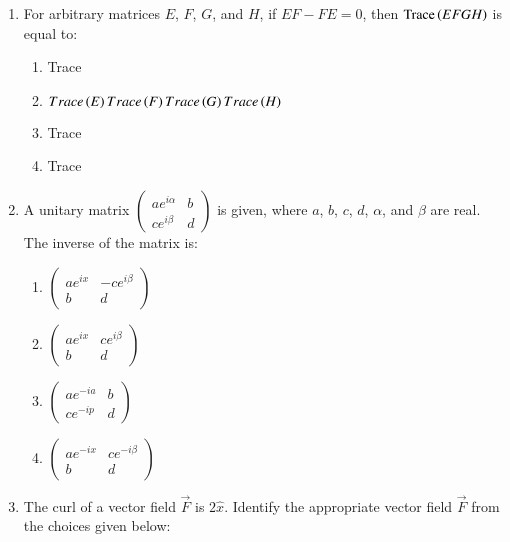 \documentclass[journal,9pt,onecolumn]{IEEEtran}
\begin{document}
\begin{enumerate}


\item For arbitrary matrices $E$, $F$, $G$, and $H$, if $EF - FE = 0$, then $\text{Trace}\left(EFGH\right)$ is equal to:
\begin{multicols}{2}
\begin{enumerate}
    \item Trace
    \item $Trace\left(E\right) Trace\left(F\right)Trace\left(G\right)Trace\left(H\right)$
    \item Trace
    \item Trace
\end{enumerate}
\end{multicols}

\item A unitary matrix $\begin{pmatrix} ae^{i\alpha} & b \\ ce^{i\beta} & d \end{pmatrix}$ is given, where $a$, $b$, $c$, $d$, $\alpha$, and $\beta$ are real. The inverse of the matrix is:
\begin{multicols}{4}
\begin{enumerate}
     \item $\begin{pmatrix} ae^{ix} & -ce^{i\beta} \\ b & d \end{pmatrix}$
    \item $\begin{pmatrix} ae^{ix} & ce^{i\beta} \\ b & d \end{pmatrix}$
    \item $\begin{pmatrix} ae^{-ia} & b \\ ce^{-ip} & d \end{pmatrix}$
    \item $\begin{pmatrix} ae^{-ix} & ce^{-i\beta} \\ b & d \end{pmatrix}$
\end{enumerate}
\end{multicols}


\item The curl of a vector field $\overrightarrow{F}$ is $2\hat{x}$. Identify the appropriate vector field $\overrightarrow{F}$ from the choices given below:


\end{enumerate}
\end{document}
